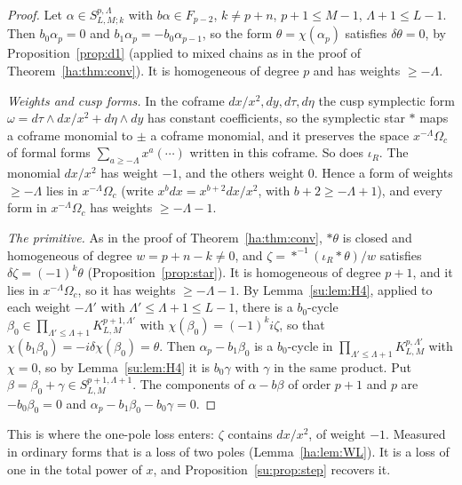 \begin{proof}
Let \(\alpha\in S^{p,\Lambda}_{L,M;k}\) with \(b\alpha\in F_{p-2}\),
\(k\ne p+n\), \(p+1\le M-1\), \(\Lambda+1\le L-1\). Then
\(b_0\alpha_p=0\) and \(b_1\alpha_p=-b_0\alpha_{p-1}\), so the form
\(\theta=\chi(\alpha_p)\) satisfies \(\delta\theta=0\), by
Proposition~\ref{prop:d1} (applied to mixed chains as in the proof of
Theorem~\ref{ha:thm:conv}). It is homogeneous of degree \(p\) and has
weights \(\ge-\Lambda\).

\emph{Weights and cusp forms.} In the coframe \(dx/x^2,dy,d\tau,d\eta\)
the cusp symplectic form \(\omega=d\tau\wedge dx/x^2+d\eta\wedge dy\) has
constant coefficients, so the symplectic star \(*\) maps a coframe
monomial to \(\pm\) a coframe monomial, and it preserves the space
\(x^{-\Lambda}\Omega_c\) of formal forms \(\sum_{a\ge-\Lambda}x^a
(\cdots)\) written in this coframe. So does \(\iota_R\). The monomial
\(dx/x^2\) has weight \(-1\), and the others weight \(0\). Hence a form of
weights \(\ge-\Lambda\) lies in \(x^{-\Lambda}\Omega_c\) (write
\(x^bdx=x^{b+2}dx/x^2\), with \(b+2\ge-\Lambda+1\)), and every form in
\(x^{-\Lambda}\Omega_c\) has weights \(\ge-\Lambda-1\).

\emph{The primitive.} As in the proof of Theorem~\ref{ha:thm:conv},
\(*\theta\) is closed and homogeneous of degree \(w=p+n-k\ne0\), and
\(\zeta=*^{-1}(\iota_R*\theta)/w\) satisfies \(\delta\zeta=(-1)^k\theta\)
(Proposition~\ref{prop:star}). It is homogeneous of degree \(p+1\), and it
lies in \(x^{-\Lambda}\Omega_c\), so it has weights \(\ge-\Lambda-1\).
By Lemma~\ref{su:lem:H4}, applied to each weight \(-\Lambda'\) with
\(\Lambda'\le\Lambda+1\le L-1\), there is a \(b_0\)-cycle \(\beta_0\in
\prod_{\Lambda'\le\Lambda+1}K^{p+1,\Lambda'}_{L,M}\) with
\(\chi(\beta_0)=(-1)^ki\zeta\), so that \(\chi(b_1\beta_0)=-i\delta
\chi(\beta_0)=\theta\). Then \(\alpha_p-b_1\beta_0\) is a \(b_0\)-cycle in
\(\prod_{\Lambda'\le\Lambda+1}K^{p,\Lambda'}_{L,M}\) with \(\chi=0\), so by
Lemma~\ref{su:lem:H4} it is \(b_0\gamma\) with \(\gamma\) in the same
product. Put \(\beta=\beta_0+\gamma\in S^{p+1,\Lambda+1}_{L,M}\). The
components of \(\alpha-b\beta\) of order \(p+1\) and \(p\) are
\(-b_0\beta_0=0\) and \(\alpha_p-b_1\beta_0-b_0\gamma=0\).
\end{proof}

This is where the one-pole loss enters: \(\zeta\) contains
\(dx/x^2\), of weight \(-1\). Measured in ordinary forms that is a loss
of two poles (Lemma~\ref{ha:lem:WL}). It is a loss of one in the total
power of \(x\), and Proposition~\ref{su:prop:step} recovers it.

